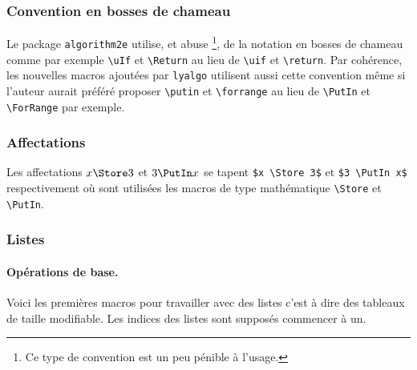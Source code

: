 \subsubsection{Convention en bosses de chameau}

Le package \verb+algorithm2e+ utilise, et abuse
\footnote{
	Ce type de convention est un peu pénible à l'usage.
},
de la notation en bosses de chameau comme par exemple \verb+\uIf+ et \verb+\Return+ au lieu de \verb+\uif+ et \verb+\return+.
Par cohérence, les nouvelles macros ajoutées par \verb+lyalgo+ utilisent aussi cette convention même si l'auteur aurait préféré proposer \verb+\putin+ et \verb+\forrange+ au lieu de \verb+\PutIn+ et \verb+\ForRange+ par exemple.




\subsubsection{Affectations}

Les affectations $x \Store 3$ et $3 \PutIn x$ se tapent \verb+$x \Store 3$+ et \verb+$3 \PutIn x$+ respectivement où sont utilisées les macros de type mathématique \verb+\Store+ et \verb+\PutIn+.




\subsubsection{Listes}

\paragraph{Opérations de base.}\phantom{XX}\smallskip

Voici les premières macros pour travailler avec des listes c'est à dire des tableaux de taille modifiable.
Les indices des listes sont supposés commencer à un.

